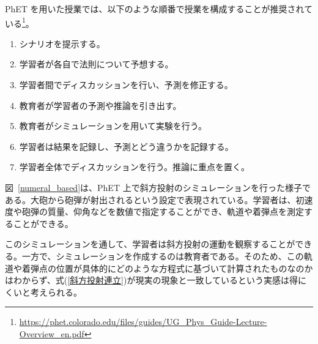 PhET を用いた授業では、以下のような順番で授業を構成することが推奨されている\footnote{\url{https://phet.colorado.edu/files/guides/UG_Phys_Guide-Lecture-Overview_en.pdf}}。
\begin{enumerate}
  \item シナリオを提示する。
  \item 学習者が各自で法則について予想する。
  \item 学習者間でディスカッションを行い、予測を修正する。
  \item 教育者が学習者の予測や推論を引き出す。
  \item 教育者がシミュレーションを用いて実験を行う。
  \item 学習者は結果を記録し、予測とどう違うかを記録する。
  \item 学習者全体でディスカッションを行う。推論に重点を置く。
\end{enumerate}

図~\ref{numeral_based}は、PhET 上で斜方投射のシミュレーションを行った様子である。大砲から砲弾が射出されるという設定で表現されている。学習者は、初速度や砲弾の質量、仰角などを数値で指定することができ、軌道や着弾点を測定することができる。

このシミュレーションを通して、学習者は斜方投射の運動を観察することができる。一方で、シミュレーションを作成するのは教育者である。そのため、この軌道や着弾点の位置が具体的にどのような方程式に基づいて計算されたものなのかはわからず、式(\ref{斜方投射連立})が現実の現象と一致しているという実感は得にくいと考えられる。
